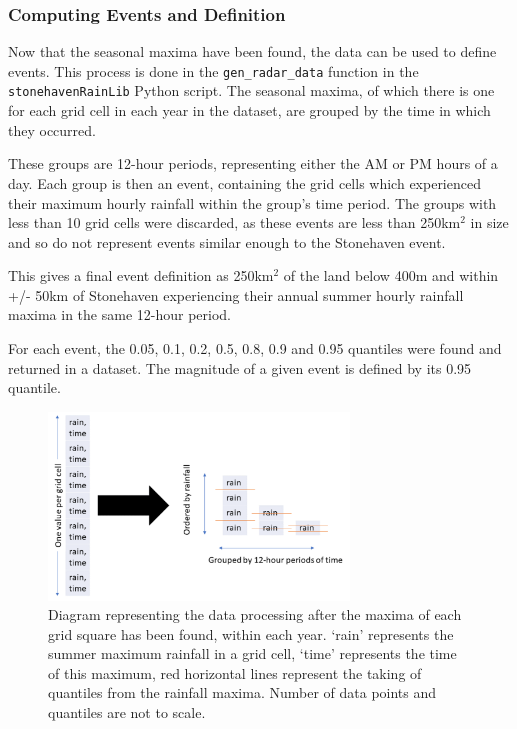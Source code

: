 \documentclass[12pt,a4paper]{report}
\begin{document}
\subsubsection{Computing Events and Definition}

Now that the seasonal maxima have been found,
    the data can be used to define events.
This process is done in the \texttt{gen\_radar\_data} function in the \texttt{stonehavenRainLib} Python script.
The seasonal maxima,
    of which there is one for each grid cell in each year in the dataset,
    are grouped by the time in which they occurred.

These groups are 12-hour periods,
    representing either the AM or PM hours of a day.
Each group is then an event,
    containing the grid cells which experienced their maximum hourly rainfall within the group's time period.
The groups with less than 10 grid cells were discarded,
    as these events are less than 250km$^2$ in size and
    so do not represent events similar enough to the Stonehaven event.

This gives a final event definition as 250km$^2$ of the land below 400m and within +/- 50km of Stonehaven
    experiencing their annual summer hourly rainfall maxima in the same 12-hour period.

For each event, the 0.05, 0.1, 0.2, 0.5, 0.8, 0.9 and 0.95 quantiles were found and returned in a dataset.
The magnitude of a given event is defined by its 0.95 quantile.

\begin{figure}[H]
    \centering
    \includegraphics[width=80mm]{dataprocessschematic}
    \caption{Diagram representing the data processing after the maxima of each grid square has been found,
    within each year.
    `rain' represents the summer maximum rainfall in a grid cell,
        `time' represents the time of this maximum,
        red horizontal lines represent the taking of quantiles from the rainfall maxima.
    Number of data points and quantiles are not to scale.}
    \label{fig:dataprocessschematic}
\end{figure}
\end{document}
